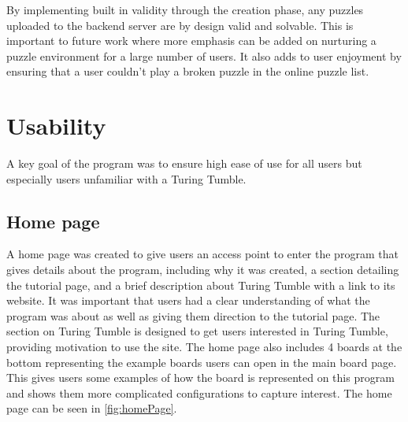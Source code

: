 \documentclass{l4proj}
\begin{document}
By implementing built in validity through the creation phase, any puzzles uploaded to the backend server are by design valid and solvable. This is important to future work where more emphasis can be added on nurturing a puzzle environment for a large number of users. It also adds to user enjoyment by ensuring that a user couldn't play a broken puzzle in the online puzzle list.



\section{Usability}
A key goal of the program was to ensure high ease of use for all users but especially users unfamiliar with a Turing Tumble. 

\subsection{Home page}
A home page was created to give users an access point to enter the program that gives details about the program, including why it was created, a section detailing the tutorial page, and a brief description about Turing Tumble with a link to its website. It was important that users had a clear understanding of what the program was about as well as giving them direction to the tutorial page. The section on Turing Tumble is designed to get users interested in Turing Tumble, providing motivation to use the site. The home page also includes 4 boards at the bottom representing the example boards users can open in the main board page. This gives users some examples of how the board is represented on this program and shows them more complicated configurations to capture interest. The home page can be seen in \ref{fig:homePage}.
\end{document}
